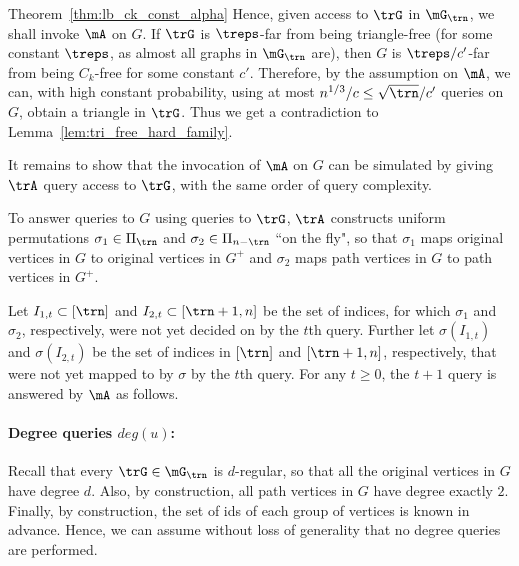 \begin{proofof}{Theorem~\ref{thm:lb_ck_const_alpha}}
Hence, given access to $\trG$ in $\mG_{\trn}$,  we shall invoke $\mA$ on $G$.
If $\trG$ is $\treps$-far from being triangle-free (for some constant $\treps$, as almost all graphs in $\mG_{\trn}$ are), then $G$ is $\treps/c'$-far from being $C_k$-free for some constant $c'$. Therefore, by the assumption on $\mA$, we can, with high constant probability, using %
at most $n^{1/3}/c \leq \sqrt{\trn}/c'$ %
queries on $G$, 
obtain a triangle in $\trG$.
Thus we get a contradiction to Lemma~\ref{lem:tri_free_hard_family}. 

It remains to show that  the invocation of $\mA$ on $G$ can be simulated by giving $\trA$ query access to $\trG$, with the same order of query complexity. %


To answer queries to $G$ using queries to $\trG$, $\trA$ constructs uniform permutations $\sigma_1\in\Pi_{\trn}$ and $\sigma_2 \in \Pi_{n-\trn}$ ``on the fly", so that  $\sigma_1$ maps original vertices in $G$ to original vertices in $G^+$ and $\sigma_2$ maps path vertices in $G$ to path vertices in $G^+$.  

Let $I_{1,t}\subset[\trn]$ and $I_{2,t}\subset [\trn+1, n]$ be the set of indices,  for which $\sigma_1$ and $\sigma_2$, respectively,  were not yet decided on by the $t$th query.  Further let  $\sigma(I_{1,t})$ and $\sigma(I_{2,t})$ be the set of indices in $[\trn]$ and $[\trn+1, n]$, respectively, that were not yet mapped to by $\sigma$ by the $t$th query.
For any $t\geq 0$,  the $t+1$ query is   answered by $\mA$ as follows. 



\paragraph{Degree queries $deg(u)$:} 



Recall that every $\trG\in \mG_{\trn}$ is $d$-regular, so that all the original vertices in $G$ have degree $d$. Also, by construction, all path vertices in $G$ have degree exactly $2$. Finally, by construction, the set of ids of each group of vertices is known in advance. Hence, we can assume without loss of generality that no degree queries are performed.



\end{proofof}
